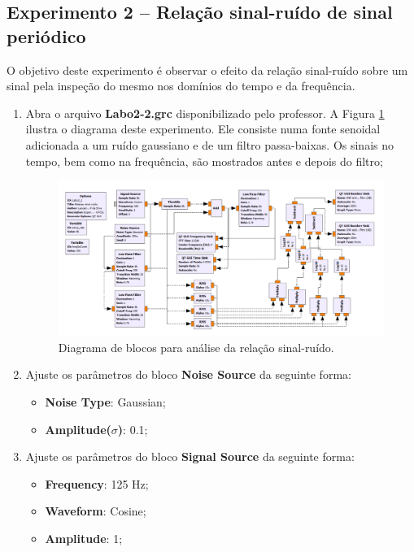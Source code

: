 \documentclass[12pt,addpoints]{exam}
\begin{document}
\subsection{Experimento 2 -- Relação sinal-ruído de sinal periódico}

O objetivo deste experimento é observar o efeito da relação sinal-ruído sobre um sinal pela inspeção do mesmo nos domínios do tempo e da frequência.

\begin{enumerate}
    \item Abra o arquivo \textbf{Labo2-2.grc} disponibilizado pelo professor. A Figura \ref{fig:GRC_2-2a} ilustra o diagrama deste experimento. Ele consiste numa fonte senoidal adicionada a um ruído gaussiano e de um filtro passa-baixas. Os sinais no tempo, bem como na frequência, são mostrados antes e depois do filtro;
    \begin{figure}[htb]
        \centering
        \includegraphics[width=1.0\linewidth]{./Figuras/GRC_2-2}
        \caption{Diagrama de blocos para análise da relação sinal-ruído.} 
        \label{fig:GRC_2-2a}
    \end{figure}
    \item Ajuste os parâmetros do bloco \textbf{Noise Source} da seguinte forma:
    \begin{itemize}
        \item \textbf{Noise Type}: Gaussian;
        \item \textbf{Amplitude($\sigma$)}: 0.1;
    \end{itemize}
    \item Ajuste os parâmetros do bloco \textbf{Signal Source} da seguinte forma:
    \begin{itemize}
        \item \textbf{Frequency}: 125 Hz;
        \item \textbf{Waveform}: Cosine;
        \item \textbf{Amplitude}: 1;

\end{itemize}
\end{enumerate}
\end{document}
